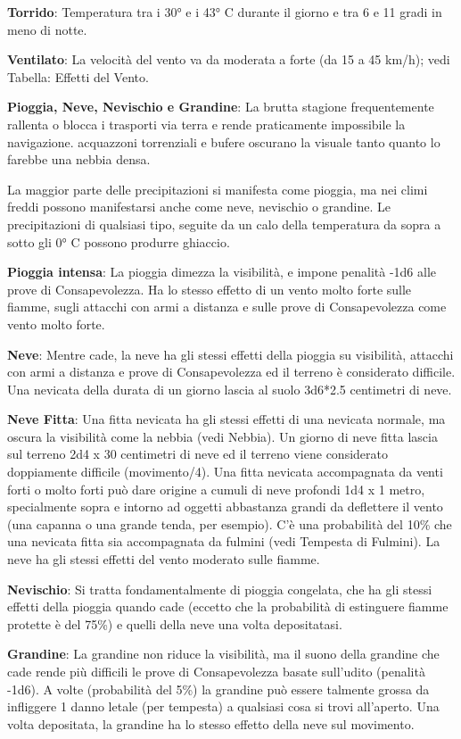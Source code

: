 \begin{multicols}{2}
\textbf{Torrido}: Temperatura tra i 30° e i 43° C durante il giorno e tra 6 e 11 gradi in meno di notte.

\textbf{Ventilato}: La velocità del vento va da moderata a forte (da 15 a 45 km/h); vedi Tabella: Effetti del Vento.

\textbf{Pioggia, Neve, Nevischio e Grandine}: La brutta stagione frequentemente rallenta o blocca i trasporti via terra e rende praticamente impossibile la navigazione. acquazzoni torrenziali e bufere oscurano la visuale tanto quanto lo farebbe una nebbia densa.

La maggior parte delle precipitazioni si manifesta come pioggia, ma nei climi freddi possono manifestarsi anche come neve, nevischio o grandine. Le precipitazioni di qualsiasi tipo, seguite da un calo della temperatura da sopra a sotto gli 0° C possono produrre ghiaccio.


\textbf{Pioggia intensa}: La pioggia dimezza la visibilità, e impone penalità -1d6 alle prove di Consapevolezza. Ha lo stesso effetto di un vento molto forte sulle fiamme, sugli attacchi con armi a distanza e sulle prove di Consapevolezza come vento molto forte.

\textbf{Neve}: Mentre cade, la neve ha gli stessi effetti della pioggia su visibilità, attacchi con armi a distanza e prove di Consapevolezza ed il terreno è considerato difficile. Una nevicata della durata di un giorno lascia al suolo 3d6*2.5 centimetri di neve.

\textbf{Neve Fitta}: Una fitta nevicata ha gli stessi effetti di una nevicata normale, ma oscura la visibilità come la nebbia (vedi Nebbia). Un giorno di neve fitta lascia sul terreno 2d4 x 30 centimetri di neve ed il terreno viene considerato doppiamente difficile (movimento/4). Una fitta nevicata accompagnata da venti forti o molto forti può dare origine a cumuli di neve profondi 1d4 x 1 metro, specialmente sopra e intorno ad oggetti abbastanza grandi da deflettere il vento (una capanna o una grande tenda, per esempio).
C'è una probabilità del 10\% che una nevicata fitta sia accompagnata da fulmini (vedi Tempesta di Fulmini). La neve ha gli stessi effetti del vento moderato sulle fiamme.

\textbf{Nevischio}: Si tratta fondamentalmente di pioggia congelata, che ha gli stessi effetti della pioggia quando cade (eccetto che la probabilità di estinguere fiamme protette è del 75\%) e quelli della neve una volta depositatasi.

\textbf{Grandine}: La grandine non riduce la visibilità, ma il suono della grandine che cade rende più difficili le prove di Consapevolezza basate sull'udito (penalità -1d6). A volte (probabilità del 5\%) la grandine può essere talmente grossa da infliggere 1 danno letale (per tempesta) a qualsiasi cosa si trovi all'aperto. Una volta depositata, la grandine ha lo stesso effetto della neve sul movimento.


\end{multicols}

